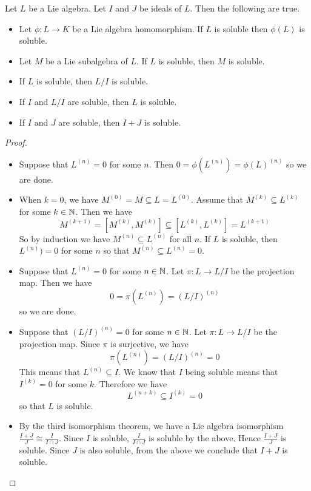 \documentclass[a4paper]{article}
\begin{document}
\begin{prp}{}{} Let $L$ be a Lie algebra. Let $I$ and $J$ be ideals of $L$. Then the following are true. 
\begin{itemize}
\item Let $\phi:L\to K$ be a Lie algebra homomorphism. If $L$ is soluble then $\phi(L)$ is soluble. 
\item Let $M$ be a Lie subalgebra of $L$. If $L$ is soluble, then $M$ is soluble. 
\item If $L$ is soluble, then $L/I$ is soluble. 
\item If $I$ and $L/I$ are soluble, then $L$ is soluble. 
\item If $I$ and $J$ are soluble, then $I+J$ is soluble. 
\end{itemize} \tcbline
\begin{proof}~\\
\begin{itemize}
\item Suppose that $L^{(n)}=0$ for some $n$. Then $0=\phi(L^{(n)})=\phi(L)^{(n)}$ so we are done. 
\item When $k=0$, we have $M^{(0)}=M\subseteq L=L^{(0)}$. Assume that $M^{(k)}\subseteq L^{(k)}$ for some $k\in\mathbb{N}$. Then we have $$M^{(k+1)}=[M^{(k)},M^{(k)}]\subseteq[L^{(k)},L^{(k)}]=L^{(k+1)}$$ So by induction we have $M^{(n)}\subseteq L^{(n)}$ for all $n$. If $L$ is soluble, then $L^{(n)})=0$ for some $n$ so that $M^{(n)}\subseteq L^{(n)}=0$. 
\item Suppose that $L^{(n)}=0$ for some $n\in\mathbb{N}$. Let $\pi:L\to L/I$ be the projection map. Then we have $$0=\pi(L^{(n)})=(L/I)^{(n)}$$ so we are done. 
\item Suppose that $(L/I)^{(n)}=0$ for some $n\in\mathbb{N}$. Let $\pi:L\to L/I$ be the projection map. Since $\pi$ is surjective, we have $$\pi(L^{(n)})=(L/I)^{(n)}=0$$ This means that $L^{(n)}\subseteq I$. We know that $I$ being soluble means that $I^{(k)}=0$ for some $k$. Therefore we have $$L^{(n+k)}\subseteq I^{(k)}=0$$ so that $L$ is soluble. 
\item By the third isomorphism theorem, we have a Lie algebra isomorphism $\frac{I+J}{J}\cong\frac{I}{I\cap J}$. Since $I$ is soluble, $\frac{I}{I\cap J}$ is soluble by the above. Hence $\frac{I+J}{J}$ is soluble. Since $J$ is also soluble, from the above we conclude that $I+J$ is soluble. 
\end{itemize}
\end{proof}
\end{prp}
\end{document}
